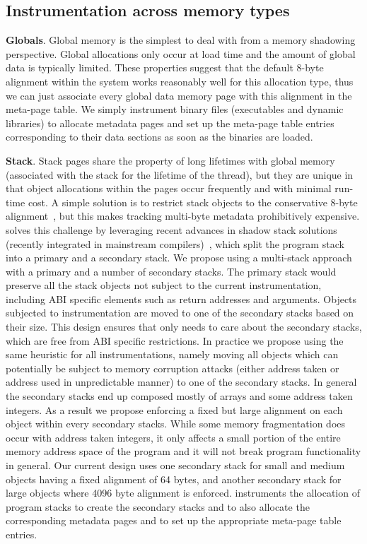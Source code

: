 \subsection{Instrumentation across memory types}
\label{sec:assumptions}

\textbf{Globals}. Global memory is the simplest to deal with from a memory shadowing perspective. Global allocations only occur at load time and the amount of global data is typically
limited. These properties suggest that the default 8-byte alignment within the system works reasonably well for this allocation type, thus we can just associate every global data memory page with this alignment in the meta-page table.
We simply instrument binary files (executables and dynamic libraries) to allocate metadata pages and set up the meta-page table entries corresponding to their data sections as soon as the binaries are loaded.

\textbf{Stack}. Stack pages share the property of long lifetimes with global memory (associated with the stack for the lifetime of the thread), but they are unique in that object allocations within the pages occur frequently and with minimal run-time cost. A simple solution is to restrict stack objects to the conservative 8-byte alignment~\cite{akritidis2008preventing},
but this makes tracking multi-byte metadata
prohibitively expensive. \projectname{} solves this challenge by leveraging recent advances
in shadow stack solutions (recently integrated in mainstream compilers)~\cite{kuznetsov2014cpi}, which split the program stack into a primary and a secondary stack.
We propose using a multi-stack approach with a primary and a number of secondary stacks. The primary stack would preserve all the stack objects not subject to
the current instrumentation, including ABI specific elements such as return addresses and arguments. Objects subjected to instrumentation are moved to one of the secondary
stacks based on their size. This design ensures that \projectname{} only needs to care about the secondary stacks, which are free from ABI specific restrictions.
In practice we propose using the same heuristic for all instrumentations, namely moving all objects which can potentially be subject to memory
corruption attacks (either address taken or address used in unpredictable manner) to one of the secondary stacks. In general the secondary stacks end up composed
mostly of arrays and some address taken integers. As a result we propose enforcing a fixed but
large alignment on each object within every secondary stacks. While some memory fragmentation
does occur with address taken integers, it only affects a small portion of the entire
memory address space of the program and it will not break program functionality in general.
Our current design uses one secondary stack for small and medium objects having a fixed alignment of 64 bytes,
and another secondary stack for large objects where 4096 byte alignment is enforced.
\projectname{} instruments the allocation of program stacks to create the secondary stacks
and to also allocate the corresponding metadata pages and to set up the appropriate meta-page table entries.

